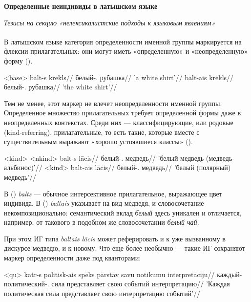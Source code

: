 \documentclass[a4paper, 12pt]{article}
\begin{document}


\textbf{Определенные неиндивиды в латышском языке}

\textit{Тезисы на секцию «нелексикалистские подходы к языковым явлениям»}\\\\
В латышском языке категория определенности именной группы маркируется на флексии прилагательных: они могут иметь «определенную» и «неопределенную» форму (\nextx).

\pex<base>
    \a \begingl
        \gla balt-s krekls//
        \glb белый-\M{}.\Indef{} рубашка//
        \glft 'a white shirt'//
    \endgl
    \a \begingl
        \gla balt-ais krekls//
        \glb белый-\M{}.\Def{} рубашка//
        \glft 'the white shirt'//
    \endgl
\xe

Тем не менее, этот маркер не влечет неопределенности именной группы. Определенное множество прилагательных требует определенной формы даже в неопределенных контекстах. Среди них --- классифицирующие, или родовые (kind-referring), прилагательные, то есть такие, которые вместе с существительным выражают «хорошо устоявшиеся классы» \citep{carlson1977, trugman2005} (\nextx).

\pex<kind>
    \a<nkind> \begingl
        \gla balt-s lācis//
        \glb белый-\M.\Indef{} медведь//
        \glft 'белый медведь (медведь-альбинос)'//
    \endgl 
    \a<kind> \begingl
        \gla balt-ais lācis//
        \glb белый-\M.\Def{} медведь//
        \glft 'белый (полярный) медведь'//
    \endgl
\xe

В () \textit{balts} --- обычное интерсективное прилагательное, выражающее цвет индивида. В () \textit{baltais} указывает на вид медведя, и словосочетание некомпозиционально: семантический вклад \textit{белый} здесь уникален и отличается, например, от такового в подобном же словосочетании \textit{белый чай}.

При этом ИГ типа \textit{baltais lācis} может реферировать и к уже вызванному в дискурсе медведю, и к новому. Что еще более необычно --- такие ИГ сохраняют маркер определенности даже под кванторами:

\ex<qu> \begingl
        \gla katr-s politisk-ais spēks pārstāv savu notikumu interpretāciju//
        \glb каждый-\M{} политический-\M.\Def{} сила представляет свою событий интерпретацию//
        \glft 'Каждая политическая сила представляет свою интерпретацию событий'//
    \endgl
\xe
\end{document}

